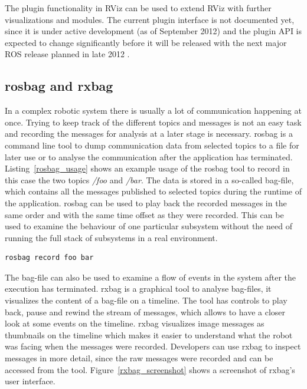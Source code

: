 The plugin functionality in RViz can be used to extend RViz with further visualizations and modules. The current plugin interface is not documented yet, since it is under active development (as of September 2012) and the plugin API is expected to change significantly before it will be released with the next major ROS release planned in late 2012 \cite{rvizPlugin}.

\subsection{rosbag and rxbag}
In a complex robotic system there is usually a lot of communication happening at once. Trying to keep track of the different topics and messages is not an easy task and recording the messages for analysis at a later stage is necessary. rosbag is a command line tool to dump communication data from selected topics to a file for later use or to analyse the communication after the application has terminated. Listing~\ref{rosbag_usage} shows an example usage of the rosbag tool to record in this case the two topics \emph{/foo} and \emph{/bar}. The data is stored in a so-called bag-file, which contains all the messages published to selected topics during the runtime of the application. rosbag can be used to play back the recorded messages in the same order and with the same time offset as they were recorded. This can be used to examine the behaviour of one particular subsystem without the need of running the full stack of subsystems in a real environment.

\vspace{1em}
\begin{lstlisting}[frame=single,caption={Example usage of rosbag.},label=rosbag_usage]
rosbag record foo bar
\end{lstlisting}

The bag-file can also be used to examine a flow of events in the system after the execution has terminated. rxbag is a graphical tool to analyse bag-files, it visualizes the content of a bag-file on a timeline. The tool has controls to play back, pause and rewind the stream of messages, which allows to have a closer look at some events on the timeline. rxbag visualizes image messages as thumbnails on the timeline which makes it easier to understand what the robot was facing when the messages were recorded. Developers can use rxbag to inspect messages in more detail, since the raw messages were recorded and can be accessed from the tool. Figure~\ref{rxbag_screenshot} shows a screenshot of rxbag's user interface.

